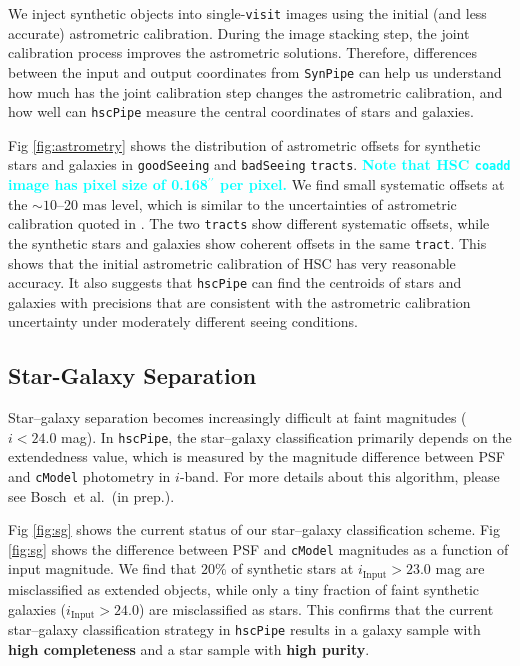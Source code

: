 \documentclass[useamsfonts]{pasj01}
\def\asec{$^{\prime\prime}$}
\def\etal{{\ et al.~}}
\def\hscpipe{\texttt{hscPipe}}
\def\synpipe{\texttt{SynPipe}}
\def\cmodel{\texttt{cModel}}
\def\coadd{\texttt{coadd}}
\def\tract{\texttt{tract}}
\def\visit{\texttt{visit}}
\def\tracts{\texttt{tracts}}
\newcommand{\song}[1]{\textcolor{cyan} {\textbf{#1}}}
\begin{document}
    We inject synthetic objects into single-\visit{} images using the initial (and 
    less accurate) astrometric calibration.
    During the image stacking step, the joint calibration process improves the
    astrometric solutions.
    Therefore, differences between the input and output coordinates from \synpipe{}
    can help us understand how much has the joint calibration step changes the 
    astrometric calibration, and how well can \hscpipe{} measure the central 
    coordinates of stars and galaxies. 

    Fig \ref{fig:astrometry} shows the distribution of astrometric offsets for 
    synthetic stars and galaxies in \texttt{goodSeeing} and \texttt{badSeeing} 
    \tracts{}.
    \song{
    Note that HSC \coadd{} image has pixel size of 0.168\asec{} per pixel. 
    }
    We find small systematic offsets at the ${\sim}10$--20 mas level, which is similar 
    to the uncertainties of astrometric calibration quoted in \citet{HSCDR1}.
    The two \tracts{} show different systematic offsets, while the synthetic stars and
    galaxies show coherent offsets in the same \tract{}.
    This shows that the initial astrometric calibration of HSC has very reasonable 
    accuracy.  
    It also suggests that \hscpipe{} can find the centroids of stars and galaxies 
    with precisions that are consistent with the astrometric calibration uncertainty
    under moderately different seeing conditions. 
    
\subsection{Star-Galaxy Separation}
    \label{ssec:sg}

    Star--galaxy separation becomes increasingly difficult at faint magnitudes 
    ($i<24.0$ mag).
    In \hscpipe{}, the star--galaxy classification primarily depends on the 
    extendedness value, which is measured by the magnitude difference between PSF and 
    \cmodel{} photometry in $i$-band.
    For more details about this algorithm, please see Bosch\etal (in prep.).

    Fig \ref{fig:sg} shows the current status of our star--galaxy classification 
    scheme.  
    Fig \ref{fig:sg} shows the difference between PSF and \cmodel{} magnitudes as a 
    function of input magnitude. 
    We find that $20$\% of synthetic stars at $i_{\mathrm{Input}}>23.0$ mag are 
    misclassified as extended objects, while only a tiny fraction of faint synthetic 
    galaxies ($i_{\mathrm{Input}}>24.0$) are misclassified as stars. 
    This confirms that the current star--galaxy classification strategy in \hscpipe{}
    results in a galaxy sample with \textbf{high completeness} and a star sample
    with \textbf{high purity}.
\end{document}
